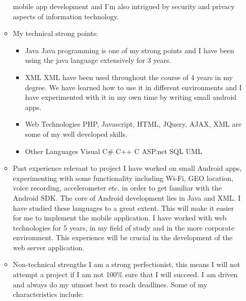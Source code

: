\documentclass[12pt, oneside]{article}
\begin{document}
\begin{enumerate}
\begin{itemize}
				mobile app development and I'm also intrigued by security and privacy aspects of information technology.\newline
			\item My technical strong points:
				\begin{itemize}
				\item Java\newline
					Java programming is one of my strong points and I have been using the java language extensively for 3 years.
				\item XML\newline
					XML have been used throughout the course of 4 years in my degree. We have learned how to use it 
					in different environments and I have experimented with it in my own time by writing small android apps.
				\item Web Technologies\newline
					PHP, Javascript, HTML, JQuery, AJAX, XML are some of my well developed skills.
				\item Other Languages\newline
					Visual C\#\newline
					C++\newline
					C\newline
					ASP.net\newline
					SQL\newline
					UML\newline	
				\end{itemize}				
			\item Past experience relevant to project\newline\newline
				I have worked on small Android apps, experimenting with some functionality including Wi-Fi, GEO location, voice recording, accelerometer etc. in order to get familiar with the Android SDK. The core of Android development lies in Java and XML. I have studied these languages to a great extent. This will make it easier for me to implement the mobile application.  I have worked with web technologies for 5 years, in my field of study and in the more corporate environment. This experience will be crucial in the development of the web server application.\newline
			\item Non-technical strengths\newline\newline
				I am  a strong perfectionist, this means I will not attempt a project if I am not 100\% sure that I will succeed. I am driven and always do my utmost best to reach deadlines.  Some of my characteristics include:\newline 

\end{itemize}
\end{enumerate}
\end{document}
